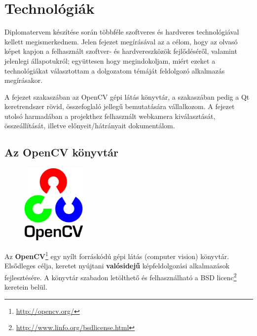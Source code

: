 \chapter{Technológiák}\label{sect:technologia}

Diplomatervem készítése során többféle szoftveres és hardveres technológiával kellett megismerkednem. Jelen fejezet megírásával az a célom, hogy az olvasó képet kapjon a felhasznált szoftver- és hardvereszközök fejlődéséről, valamint jelenlegi állapotukról; együttesen hogy megindokoljam, miért ezeket a technológiákat választottam a dolgozatom témáját feldolgozó alkalmazás megírásakor.

\bigskip

A fejezet  szakaszában az OpenCV gépi látás könyvtár, a  szakaszában pedig a Qt keretrendszer rövid, összefoglaló jellegű bemutatására vállalkozom. A fejezet utolsó harmadában a projekthez felhasznált webkamera kiválasztását, összeállítását, illetve előnyeit/hátrányait dokumentálom. 

\section{Az OpenCV könyvtár}\label{sect:opencv}

\begin{figure}
  \vspace{-20pt}
  \begin{center}
    \includegraphics[width=0.28\textwidth]{figures/opencv_logo.png}
  \end{center}
  \vspace{-30pt}
\end{figure}

Az \textbf{OpenCV}\footnote{\url{http://opencv.org/}} egy nyílt forráskódú gépi látás (computer vision) könyvtár. Elsődleges célja, keretet nyújtani \textbf{valósidejű} képfeldolgozási alkalmazások fejlesztésére. A könyvtár szabadon letölthető és felhasználható a BSD licenc\footnote{\url{http://www.linfo.org/bsdlicense.html}} keretein belül. \cite{opencv_wiki}

